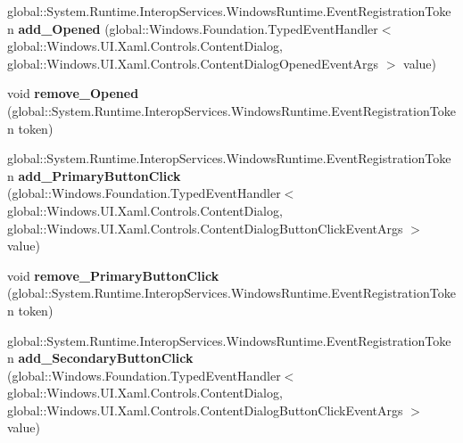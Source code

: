 \begin{DoxyCompactItemize}
global\+::\+System.\+Runtime.\+Interop\+Services.\+Windows\+Runtime.\+Event\+Registration\+Token {\bfseries add\+\_\+\+Opened} (global\+::\+Windows.\+Foundation.\+Typed\+Event\+Handler$<$ global\+::\+Windows.\+U\+I.\+Xaml.\+Controls.\+Content\+Dialog, global\+::\+Windows.\+U\+I.\+Xaml.\+Controls.\+Content\+Dialog\+Opened\+Event\+Args $>$ value)
\item 
\mbox{\label{interface_windows_1_1_u_i_1_1_xaml_1_1_controls_1_1_i_content_dialog_ad3492a494e11fd90309979866a567dfb}} 
void {\bfseries remove\+\_\+\+Opened} (global\+::\+System.\+Runtime.\+Interop\+Services.\+Windows\+Runtime.\+Event\+Registration\+Token token)
\item 
\mbox{\label{interface_windows_1_1_u_i_1_1_xaml_1_1_controls_1_1_i_content_dialog_ab6c7f4c09786d73f59362e42d3204ae4}} 
global\+::\+System.\+Runtime.\+Interop\+Services.\+Windows\+Runtime.\+Event\+Registration\+Token {\bfseries add\+\_\+\+Primary\+Button\+Click} (global\+::\+Windows.\+Foundation.\+Typed\+Event\+Handler$<$ global\+::\+Windows.\+U\+I.\+Xaml.\+Controls.\+Content\+Dialog, global\+::\+Windows.\+U\+I.\+Xaml.\+Controls.\+Content\+Dialog\+Button\+Click\+Event\+Args $>$ value)
\item 
\mbox{\label{interface_windows_1_1_u_i_1_1_xaml_1_1_controls_1_1_i_content_dialog_a53f3d58439fda719b2ff79bd2ff51652}} 
void {\bfseries remove\+\_\+\+Primary\+Button\+Click} (global\+::\+System.\+Runtime.\+Interop\+Services.\+Windows\+Runtime.\+Event\+Registration\+Token token)
\item 
\mbox{\label{interface_windows_1_1_u_i_1_1_xaml_1_1_controls_1_1_i_content_dialog_aabc798f8f7902cb7ff7745165632f610}} 
global\+::\+System.\+Runtime.\+Interop\+Services.\+Windows\+Runtime.\+Event\+Registration\+Token {\bfseries add\+\_\+\+Secondary\+Button\+Click} (global\+::\+Windows.\+Foundation.\+Typed\+Event\+Handler$<$ global\+::\+Windows.\+U\+I.\+Xaml.\+Controls.\+Content\+Dialog, global\+::\+Windows.\+U\+I.\+Xaml.\+Controls.\+Content\+Dialog\+Button\+Click\+Event\+Args $>$ value)
\item 
\mbox{\label{interface_windows_1_1_u_i_1_1_xaml_1_1_controls_1_1_i_content_dialog_a3174397ca2d88ef8ed1bd607efcbe4c9}} 

\end{DoxyCompactItemize}
